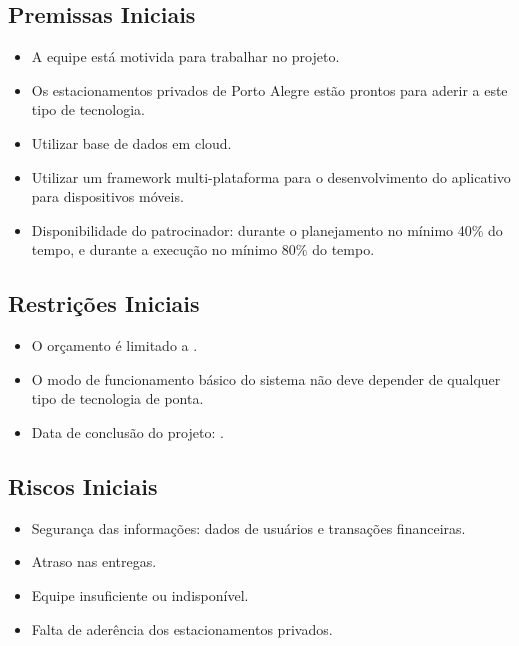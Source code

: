 


\subsection{Premissas Iniciais}

\begin{itemize}
	\item A equipe está motivida para trabalhar no projeto.
	\item Os estacionamentos privados de Porto Alegre estão prontos para aderir a este tipo de tecnologia.
	\item Utilizar base de dados em cloud.
	\item Utilizar um framework multi-plataforma para o desenvolvimento do aplicativo para dispositivos móveis.
	\item Disponibilidade do patrocinador: durante o planejamento no mínimo 40\% do tempo, e durante a execução no mínimo 80\% do tempo.
\end{itemize}

\subsection{Restrições Iniciais}

\begin{itemize}
	\item O orçamento é limitado a \maximumBudget.
	\item O modo de funcionamento básico do sistema não deve depender de qualquer tipo de tecnologia de ponta.
	\item Data de conclusão do projeto: \maximumDeadline.
\end{itemize}

\subsection{Riscos Iniciais}

\begin{itemize}
	\item Segurança das informações: dados de usuários e transações financeiras.
	\item Atraso nas entregas.
	\item Equipe insuficiente ou indisponível.
	\item Falta de aderência dos estacionamentos privados. %
\end{itemize}

